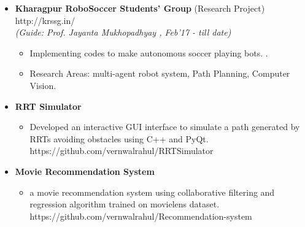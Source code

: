\documentclass[a4paper,10pt]{article}
\newcommand{\isep}{-2 pt}
\begin{document}
\begin{itemize}
\item \textbf{Kharagpur  RoboSoccer  Students'  Group} (Research Project) \hspace{0.5cm}
{http://krssg.in/}\\
 \emph{(Guide: Prof. Jayanta Mukhopadhyay
, Feb'17 - till date)} \\[-0.6cm]
	\begin{itemize}\itemsep \isep
	\item Implementing codes to make autonomous soccer playing bots. 
.
	\item Research Areas: multi-agent robot system, Path Planning, Computer Vision.
	\end{itemize} 

\item \textbf{RRT Simulator} 
	\begin{itemize}\itemsep \isep
	\item Developed an interactive GUI interface to simulate a path generated by RRTs avoiding obstacles using C++ and PyQt. \hspace{0.5cm} 
    {https://github.com/vernwalrahul/RRTSimulator} 
	\end{itemize}
	

	
\item \textbf{Movie Recommendation System} 
	\begin{itemize}\itemsep \isep
	\item a movie recommendation system using collaborative filtering and regression algorithm trained on movielens dataset. \hspace{0.5cm}
	 {https://github.com/vernwalrahul/Recommendation-system} 

	\end{itemize}	
\end{itemize}
\end{document}
